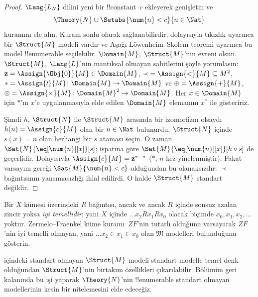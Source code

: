 \begin{proof}
$\Lang{L_N}$ dilini yeni bir !!{constant}~$c$ ekleyerek genişletin ve
\[
\Theory{N} \cup \Setabs{\num{n} < c}{n \in \Nat}
\]
kuramını ele alın. Kuram sonlu olarak sağlanabilirdir; dolayısıyla tıkızlık
uyarınca bir $\Struct{M}$ modeli vardır ve Aşağı Löwenheim--Skolem teoremi
uyarınca bu model !!{enumerable} seçilebilir. $\Domain{M}$, $\Struct{M}$'nin
evreni olsun. $\Struct{M}$, $\Lang{L}$'nin mantıksal olmayan sabitlerini
şöyle yorumlasın: $\mathbf{z} = \Assign{\Obj{0}}{M} \in \Domain{M}$,
${\prec} = \Assign{<}{M} \subseteq M^2$, $* = \Assign{\prime}{M} \colon
\Domain{M} \to \Domain{M}$ ve $\oplus = \Assign{+}{M}$,
$\otimes = \Assign{\times}{M} \colon \Domain{M}^2 \to \Domain{M}$. Her
$x \in \Domain{M}$ için $*$'ın $x$'e uygulanmasıyla elde edilen
$\Domain{M}$ elemanını $x^*$ ile gösteririz.

Şimdi $h$, $\Struct{N}$ ile $\Struct{M}$ arasında bir izomorfizm olsaydı
$h(n) = \Assign{c}{M}$ olan bir $n \in \Nat$ bulunurdu. $\Struct{N}$ içinde
$s(x)=n$ olan herhangi bir $s$ ataması seçin. O zaman
$\Sat{N}{\eq[\num{n}][x]}[s]$;  ispatına göre
$\Sat{M}{\eq[\num{n}][x]}[h \circ s]$ de geçerlidir. Dolayısıyla
$\Assign{c}{M} = \mathbf{z}^{*\cdots *}$ ($*$, $n$ kez yinelenmiştir).
Fakat varsayım gereği $\Sat{M}{\num{n} < c}$ olduğundan bu olanaksızdır:
$\prec$ bağıntısının yansımasızlığı ihlal edilirdi. O halde $\Struct{M}$
standart değildir.
\end{proof}

\begin{prob}
Bir $X$ kümesi üzerindeki $R$ bağıntısı, ancak ve ancak $R$ içinde sonsuz
azalan zincir yoksa \emph{iyi temellidir}; yani $X$ içinde
$\dots x_2Rx_1Rx_0$ olacak biçimde $x_0,x_1,x_2,\dots$ yoktur.
Zermelo--Fraenkel küme kuramı~$ZF$'nin tutarlı olduğunu varsayarak $ZF$'nin
iyi temelli olmayan, yani $\dots x_2 \in x_1 \in x_0$ olan
$\mathfrak{M}$ modelleri bulunduğunu gösterin.
\end{prob}

 içindeki standart olmayan $\Struct{M}$ modeli standart
modelle temel denk olduğundan $\Struct{M}$'nin birtakım özellikleri
çıkarılabilir. Bölümün geri kalanında bu işi yaparak $\Theory{N}$'nin
!!{enumerable} standart olmayan modellerinin kesin bir nitelemesini elde
edeceğiz.

